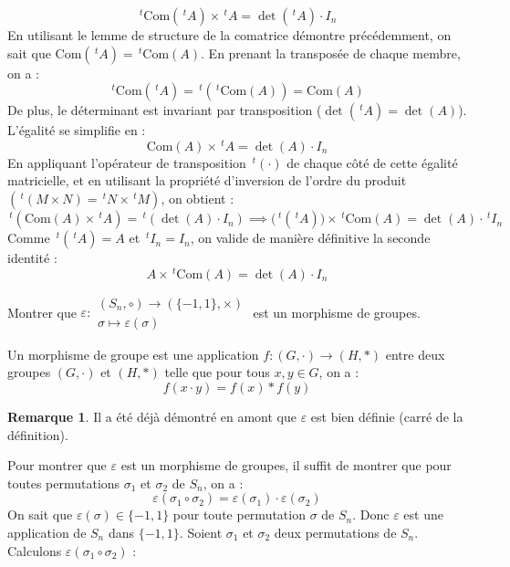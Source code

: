 \documentclass[11pt, a4paper]{article}
\theoremstyle{definition}
\newtheorem*{remarque}{Remarque}
\begin{document}
\[
\,^t\mathrm{Com}(\,^tA) \times \,^tA = \det(\,^tA) \cdot I_n
\]
En utilisant le lemme de structure de la comatrice démontre précédemment, on sait que $\mathrm{Com}(\,^tA) = \,^t\mathrm{Com}(A)$. En prenant la transposée de chaque membre, on a :
\[
\,^t\mathrm{Com}(\,^tA) = \,^t(\,^t\mathrm{Com}(A)) = \mathrm{Com}(A)
\]
De plus, le déterminant est invariant par transposition ($\det(\,^tA) = \det(A)$). L'égalité se simplifie en :
\[
\mathrm{Com}(A) \times \,^tA = \det(A) \cdot I_n
\]
En appliquant l'opérateur de transposition $\,^t(\cdot)$ de chaque côté de cette égalité matricielle, et en utilisant la propriété d'inversion de l'ordre du produit $(\,^t(M \times N) = \,^tN \times \,^tM)$, on obtient :
\[
\,^t(\mathrm{Com}(A) \times \,^tA) = \,^t(\det(A) \cdot I_n) \implies \bigl(\,^t(\,^tA)\bigr) \times \,^t\mathrm{Com}(A) = \det(A) \cdot \,^tI_n
\]
Comme $\,^t(\,^tA) = A$ et $\,^tI_n = I_n$, on valide de manière définitive la seconde identité :
\[
A \times \,^t\mathrm{Com}(A) = \det(A) \cdot I_n
\]
\clearpage

\begin{tcolorbox}[instructionstyle]
Montrer que \( \varepsilon : \begin{matrix} (S_n,\circ) \to (\{-1, 1\},\times) \\ \sigma \mapsto \varepsilon(\sigma) \end{matrix} \) est un morphisme de groupes.
\end{tcolorbox}

\begin{rappel}
	Un morphisme de groupe est une application $f : (G, \cdot) \to (H, *)$ entre deux groupes $(G, \cdot)$ et $(H, *)$ telle que pour tous $x, y \in G$, on a :
	\[
	f(x \cdot y) = f(x) * f(y)
	\]
\end{rappel}

\begin{remarque}
    Il a été déjà démontré en amont que $\varepsilon$ est bien définie (carré de la définition).
\end{remarque}

Pour montrer que $\varepsilon$ est un morphisme de groupes, il suffit de montrer que pour toutes permutations $\sigma_1$ et $\sigma_2$ de $S_n$, on a :
\[
\varepsilon(\sigma_1 \circ \sigma_2) = \varepsilon(\sigma_1) \cdot \varepsilon(\sigma_2)
\]
On sait que $\varepsilon(\sigma) \in \{-1, 1\}$ pour toute permutation $\sigma$ de $S_n$. Donc $\varepsilon$ est une application de $S_n$ dans $\{-1, 1\}$.
Soient $\sigma_1$ et $\sigma_2$ deux permutations de $S_n$. Calculons $\varepsilon(\sigma_1 \circ \sigma_2)$ :
\end{document}
